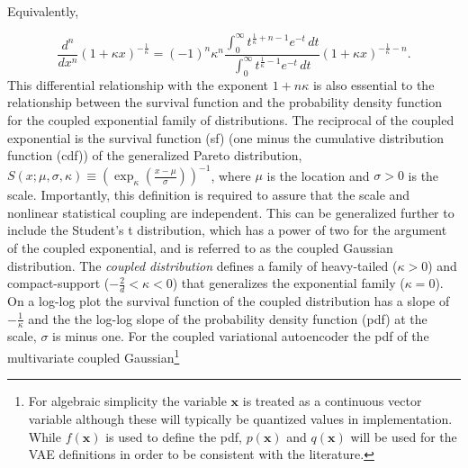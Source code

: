 \documentclass[twoside,11pt]{article}
\begin{document}
Equivalently,

\[
\frac{d^n}{dx^n}(1+\kappa x)^{-\frac{1}{\kappa}}
=(-1)^n\kappa^n\frac{\displaystyle\int_0^\infty
t^{\frac{1}{\kappa}+n-1} e^{-t}\,dt}{\displaystyle
\int_0^\infty t^{\frac{1}{\kappa}-1} e^{-t}\,dt
}(1+\kappa x)^{-\frac{1}{\kappa}-n}.
\]
This differential relationship with the exponent $1+n\kappa$ is also essential to the relationship between the survival function and the probability density function for the coupled exponential family of distributions.  The reciprocal of the coupled exponential is the survival function (sf) (one minus the cumulative distribution function (cdf)) of the generalized Pareto distribution, $S\left(x;\mu,\sigma,\kappa\right)\equiv\left(\exp_\kappa{\left(\frac{x-\mu}{\sigma}\right)}\right)^{-1}$, where $\mu$ is the location and $\sigma>0$ is the scale. Importantly, this definition is required to assure that the scale and nonlinear statistical coupling are independent. This can be generalized further to include the Student's t distribution, which has a power of two for the argument of the coupled exponential, and is referred to as the coupled Gaussian distribution. The \textit{coupled distribution} defines a family of heavy-tailed ($\kappa>0$) and compact-support ($-\frac{2}{d}<\kappa<0$) that generalizes the exponential family ($\kappa=0$). On a log-log plot the survival function of the coupled distribution has a slope of $-\frac{1}{\kappa}$  and the the log-log slope of the probability density function (pdf) at the scale, $\sigma$ is minus one. For the coupled variational autoencoder the pdf of the multivariate coupled Gaussian\footnote{For algebraic simplicity the variable $\mathbf{x}$ is treated as a continuous vector variable although these will typically be quantized values in implementation. While $f(\mathbf{x})$ is used to define the pdf, $p(\mathbf{x})$ and $q(\mathbf{x})$ will be used for the VAE definitions in order to be consistent with the literature.}
\end{document}
